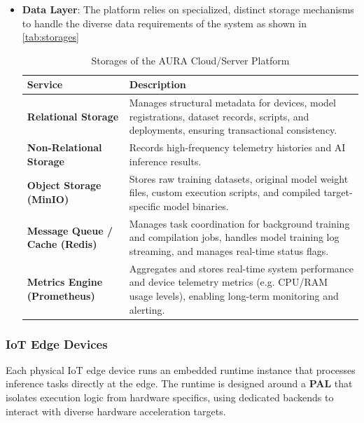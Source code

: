 \begin{itemize}
    \item \textbf{Data Layer}: The platform relies on specialized, distinct storage mechanisms to handle the diverse data requirements of the system as shown in \autoref{tab:storages}

        \begin{table}[H]
        \centering
        \caption{Storages of the \acrshort{AURA} Cloud/Server Platform}
        \label{tab:storages}
        \begin{tabular}{p{}p{}}
            \hline
            \textbf{Service} & \textbf{Description} \\
            \hline
            \textbf{Relational Storage} &
                Manages structural metadata for devices, model registrations, dataset records, scripts, and deployments, ensuring transactional consistency. \\
            \textbf{Non-Relational Storage} &
                Records high-frequency telemetry histories and \gls{AI} inference results. \\
            \textbf{Object Storage (MinIO)} &
                Stores raw training datasets, original model weight files, custom execution scripts, and compiled target-specific model binaries. \\
            \textbf{Message Queue / Cache (Redis)} &
                Manages task coordination for background training and compilation jobs, handles model training log streaming, and manages real-time status flags. \\
            \textbf{Metrics Engine (Prometheus)} &
                Aggregates and stores real-time system performance and device telemetry metrics (e.g. \gls{CPU}/\gls{RAM} usage levels), enabling long-term monitoring and alerting. \\
            \hline
        \end{tabular}
    \end{table}
    
\end{itemize}

\subsubsection{\texorpdfstring{\acrshort{IoT}}{IoT} Edge Devices}

Each physical \gls{IoT} edge device runs an embedded runtime instance that processes inference tasks directly at the edge. The runtime is designed around a \textbf{\gls{PAL}} that isolates execution logic from hardware specifics, using dedicated backends to interact with diverse hardware acceleration targets.

